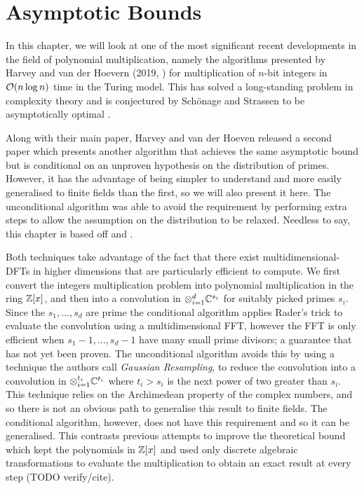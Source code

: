 \chapter{Asymptotic Bounds}\label{chp:asymptotic}

In this chapter, we will look at one of the most significant recent developments in the field of polynomial multiplication, namely the algorithms presented by Harvey and van der Hoevern (2019, \cite{nlogn}) for multiplication of $n$-bit integers in $\mathcal O(n \log n)$ time in the Turing model. This has solved a long-standing problem in complexity theory and is conjectured by Sch\"{o}nage and Strassen to be asymptotically optimal \cite{sch-str-optimality-int-mult}.

\medskip

Along with their main paper, Harvey and van der Hoeven released a second paper \cite{ffnlogn} which presents another algorithm that achieves the same asymptotic bound but is conditional on an unproven hypothesis on the distribution of primes. However, it has the advantage of being simpler to understand and more easily generalised to finite fields than the first, so we will also present it here. The unconditional algorithm was able to avoid the requirement by performing extra steps to allow the assumption on the distribution to be relaxed.
Needless to say, this chapter is based off \cite{nlogn} and \cite{ffnlogn}.

\medskip


Both techniques take advantage of the fact that there exist multidimensional-DFTs in higher dimensions that are particularly efficient to compute. We first convert the integers multiplication problem into polynomial multiplication in the ring ${\mathbb Z}[x]$, and then into a convolution in $\otimes_{i=1}^d {\mathbb C}^{s_i}$ for suitably picked primes $s_i$. Since the $s_1, \ldots, s_d$ are prime the conditional algorithm applies Rader's trick to evaluate the convolution using a multidimensional FFT, however the FFT is only efficient when $s_1 - 1, \ldots, s_d - 1$ have many small prime divisors; a guarantee that has not yet been proven. The unconditional algorithm avoids this by using a technique the authors call \emph{Gaussian Resampling}, to reduce the convolution into a convolution in $\otimes_{i=1}^{t_i} {\mathbb C}^{t_i}$ where $t_i > s_i$ is the next power of two greater than $s_i$.\\
This technique relies on the Archimedean property of the complex numbers, and so there is not an obvious path to generalise this result to finite fields. The conditional algorithm, however, does not have this requirement and so it can be generalised. This contrasts previous attempts to improve the theoretical bound which kept the polynomials in ${\mathbb Z}[x]$ and used only discrete algebraic transformations to evaluate the multiplication to obtain an exact result at every step (TODO verify/cite).

